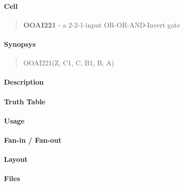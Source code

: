 \label{OOAI221}
\paragraph{Cell}
\begin{quote}
    \textbf{OOAI221} - a 2-2-1-input OR-OR-AND-Invert gate
\end{quote}

\paragraph{Synopsys}
\begin{quote}
    OOAI221(Z, C1, C, B1, B, A)
\end{quote}

\paragraph{Description}



\paragraph{Truth Table}


\paragraph{Usage}

\paragraph{Fan-in / Fan-out}

\paragraph{Layout}

\paragraph{Files}
